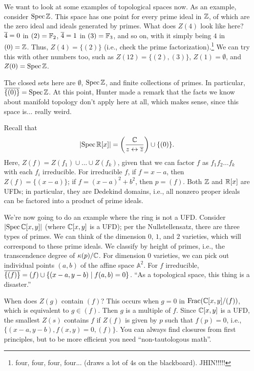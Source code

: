 We want to look at some examples of topological spaces now. As an example, consider $\operatorname{Spec} \mathbb Z$. This space has one point for every prime ideal in $\mathbb Z$, of which are the zero ideal and ideals generated by primes. What does $Z(4)$ look like here? $\overline 4 = 0$ in $(2) = \mathbb F_2$, $\overline 4 = 1$ in $(3) = \mathbb F_3$, and so on, with it simply being $4$ in $(0) = \mathbb Z$. Thus, $Z(4) = \{(2)\}$ (i.e., check the prime factorization).\footnote{four, four, four, four... (draws a lot of $4$s on the blackboard). JHIN!!!!!} We can try this with other numbers too, such as $Z(12) = \{(2), (3)\}$, $Z(1) = \emptyset$, and $Z(0) = \operatorname{Spec} \mathbb Z$.

The closed sets here are $\emptyset$, $\operatorname{Spec} \mathbb Z$, and finite collections of primes. In particular, $\overline{\{(0)\}} = \operatorname{Spec} \mathbb Z$. At this point, Hunter made a remark that the facts we know about manifold topology don't apply here at all, which makes sense, since this space is... really weird.

Recall that
\[ \left\lvert \operatorname{Spec} \mathbb R[x] \right\rvert = \left(\frac{\mathbb C}{z \leftrightarrow \overline z}\right) \cup \{(0)\}. \]
Here, $Z(f) = Z(f_1) \cup \dots \cup Z(f_k)$, given that we can factor $f$ as $f_1 f_2 \dots f_k$ with each $f_i$ irreducible. For irreducible $f$, if $f = x - a$, then $Z(f) = \{(x - a)\}$; if $f = (x - a)^2 + b^2$, then $p = (f)$. Both $\mathbb Z$ and $\mathbb R[x]$ are UFDs; in particular, they are Dedekind domains, i.e., all nonzero proper ideals can be factored into a product of prime ideals.

We're now going to do an example where the ring is not a UFD. Consider $\left\lvert \operatorname{Spec} \mathbb C[x, y] \right\rvert$ (where $\mathbb C[x, y]$ is a UFD); per the Nullstellensatz, there are three types of primes. We can think of the dimension $0$, $1$, and $2$ varieties, which will correspond to these prime ideals. We classify by height of primes, i.e., the transcendence degree of $\kappa(p)/\mathbb C$. For dimension $0$ varieties, we can pick out individual points $(a, b)$ of the affine space $\mathbb A^2$. For $f$ irreducible, $\overline{\{(f)\}} = (f) \cup \{(x - a, y - b) \mid f(a, b) = 0\}$. ``As a topological space, this thing is a disaster.''

When does $Z(g)$ contain $(f)$? This occurs when $g = 0$ in $\operatorname{Frac}(\mathbb C[x, y] / (f))$, which is equivalent to $g \in (f)$. Then $g$ is a multiple of $f$. Since $\mathbb C[x, y]$ is a UFD, the smallest $Z(s)$ contains $f$ if $Z(f)$ is given by $p$ such that $f(p) = 0$, i.e., $\{(x - a, y - b), f(x, y) = 0, (f)\}$. You can always find closures from first principles, but to be more efficient you need ``non-tautologous math''.